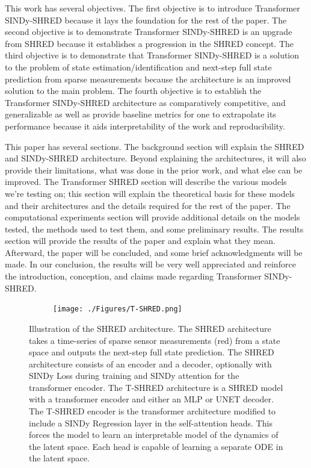\documentclass[11pt, a4paper]{article}
\begin{document}
This work has several objectives. The first objective is to introduce Transformer SINDy-SHRED because it lays the foundation for the rest of the paper. The second objective is to demonstrate Transformer SINDy-SHRED is an upgrade from SHRED because it establishes a progression in the SHRED concept. The third objective is to demonstrate that Transformer SINDy-SHRED is a solution to the problem of state estimation/identification and next-step full state prediction from sparse measurements because the architecture is an improved solution to the main problem. The fourth objective is to establish the Transformer SINDy-SHRED architecture as comparatively competitive, and generalizable as well as provide baseline metrics for one to extrapolate its performance because it aids interpretability of the work and reproducibility.




This paper has several sections. The background section will explain the SHRED and SINDy-SHRED architecture. Beyond explaining the architectures, it will also provide their limitations, what was done in the prior work, and what else can be improved. The Transformer SHRED section will describe the various models we're testing on; this section will explain the theoretical basis for these models and their architectures and the details required for the rest of the paper. The computational experiments section will provide additional details on the models tested, the methods used to test them, and some preliminary results. The results section will provide the results of the paper and explain what they mean. Afterward, the paper will be concluded, and some brief acknowledgments will be made. In our conclusion, the results will be very well appreciated and reinforce the introduction, conception, and claims made regarding Transformer SINDy-SHRED.





\begin{figure}[H]
    \centering
    \begin{subfigure}[t]{0.85\textwidth}
        \centering
        \texttt{[image: ./Figures/T-SHRED.png]}
        \caption{}
    \end{subfigure}
    \caption{Illustration of the SHRED architecture. The SHRED architecture takes a time-series of sparse sensor measurements (red) from a state space and outputs the next-step full state prediction. The SHRED architecture consists of an encoder and a decoder, optionally with SINDy Loss during training and SINDy attention for the transformer encoder. The T-SHRED architecture is a SHRED model with a transformer encoder and either an MLP or UNET decoder. The T-SHRED encoder is the transformer architecture modified to include a SINDy Regression layer in the self-attention heads. This forces the model to learn an interpretable model of the dynamics of the latent space. Each head is capable of learning a separate ODE in the latent space.}\label{fig:t_shred}
\end{figure}
\end{document}
